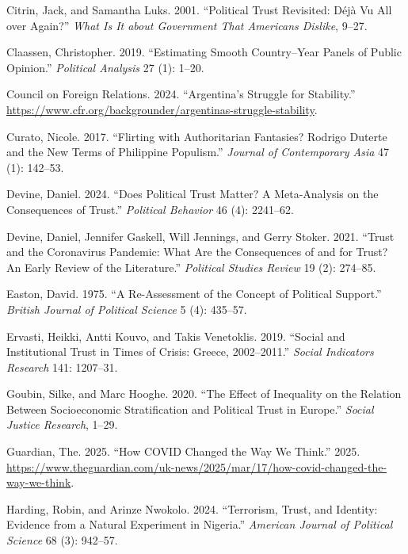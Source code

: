 \documentclass[
  12pt,
]{article}
\newlength{\cslhangindent}
\newenvironment{CSLReferences}[2] %
 {\begin{list}{}{%
  \setlength{\itemindent}{0pt}
  \setlength{\leftmargin}{0pt}
  \setlength{\parsep}{0pt}
  \ifodd #1
   \setlength{\leftmargin}{\cslhangindent}
   \setlength{\itemindent}{-1\cslhangindent}
  \fi
  \setlength{\itemsep}{#2\baselineskip}}}
 {\end{list}}
\begin{document}
\begin{CSLReferences}{1}{0}
Citrin, Jack, and Samantha Luks. 2001. {``Political Trust Revisited: D{é}j{à} Vu All over Again?''} \emph{What Is It about Government That Americans Dislike}, 9--27.

Claassen, Christopher. 2019. {``Estimating Smooth Country--Year Panels of Public Opinion.''} \emph{Political Analysis} 27 (1): 1--20.

Council on Foreign Relations. 2024. {``Argentina's Struggle for Stability.''} \url{https://www.cfr.org/backgrounder/argentinas-struggle-stability}.

Curato, Nicole. 2017. {``Flirting with Authoritarian Fantasies? Rodrigo Duterte and the New Terms of Philippine Populism.''} \emph{Journal of Contemporary Asia} 47 (1): 142--53.

Devine, Daniel. 2024. {``Does Political Trust Matter? A Meta-Analysis on the Consequences of Trust.''} \emph{Political Behavior} 46 (4): 2241--62.

Devine, Daniel, Jennifer Gaskell, Will Jennings, and Gerry Stoker. 2021. {``Trust and the Coronavirus Pandemic: What Are the Consequences of and for Trust? An Early Review of the Literature.''} \emph{Political Studies Review} 19 (2): 274--85.

Easton, David. 1975. {``A Re-Assessment of the Concept of Political Support.''} \emph{British Journal of Political Science} 5 (4): 435--57.

Ervasti, Heikki, Antti Kouvo, and Takis Venetoklis. 2019. {``Social and Institutional Trust in Times of Crisis: Greece, 2002--2011.''} \emph{Social Indicators Research} 141: 1207--31.

Goubin, Silke, and Marc Hooghe. 2020. {``The Effect of Inequality on the Relation Between Socioeconomic Stratification and Political Trust in Europe.''} \emph{Social Justice Research}, 1--29.

Guardian, The. 2025. {``How COVID Changed the Way We Think.''} 2025. \url{https://www.theguardian.com/uk-news/2025/mar/17/how-covid-changed-the-way-we-think}.

Harding, Robin, and Arinze Nwokolo. 2024. {``Terrorism, Trust, and Identity: Evidence from a Natural Experiment in Nigeria.''} \emph{American Journal of Political Science} 68 (3): 942--57.


\end{CSLReferences}
\end{document}

